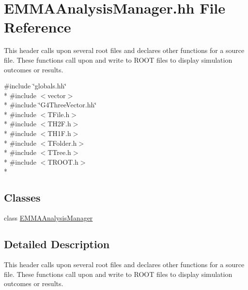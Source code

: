 \hypertarget{EMMAAnalysisManager_8hh}{\section{E\-M\-M\-A\-Analysis\-Manager.\-hh File Reference}
\label{EMMAAnalysisManager_8hh}
}


This header calls upon several root files and declares other functions for a source file. These functions call upon and write to R\-O\-O\-T files to display simulation outcomes or results.  


{\ttfamily \#include \char`\"{}globals.\-hh\char`\"{}}\\*
{\ttfamily \#include $<$vector$>$}\\*
{\ttfamily \#include \char`\"{}G4\-Three\-Vector.\-hh\char`\"{}}\\*
{\ttfamily \#include $<$T\-File.\-h$>$}\\*
{\ttfamily \#include $<$T\-H2\-F.\-h$>$}\\*
{\ttfamily \#include $<$T\-H1\-F.\-h$>$}\\*
{\ttfamily \#include $<$T\-Folder.\-h$>$}\\*
{\ttfamily \#include $<$T\-Tree.\-h$>$}\\*
{\ttfamily \#include $<$T\-R\-O\-O\-T.\-h$>$}\\*
\subsection*{Classes}
\begin{DoxyCompactItemize}
\item 
class \hyperlink{classEMMAAnalysisManager}{E\-M\-M\-A\-Analysis\-Manager}
\end{DoxyCompactItemize}


\subsection{Detailed Description}
This header calls upon several root files and declares other functions for a source file. These functions call upon and write to R\-O\-O\-T files to display simulation outcomes or results. 